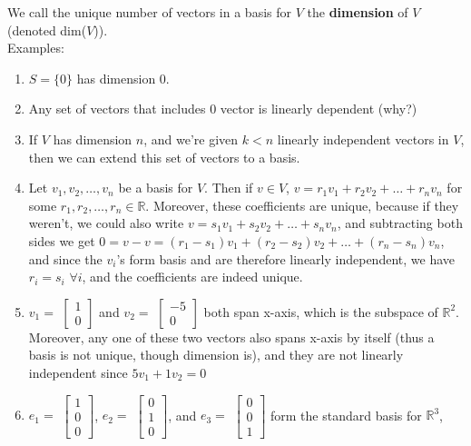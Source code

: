 \documentclass[12pt,oneside]{article}
\begin{document}
We call the unique number of vectors in a basis for $V$ the
\textbf{dimension} of $V$ (denoted dim($V$)).\\

\noindent Examples:
\begin{enumerate}
\item $S =\{0\}$ has dimension 0.
\item Any set of vectors that includes $0$ vector is linearly
  dependent (why?)
\item If $V$ has dimension $n$, and we're given $k < n$ linearly
  independent vectors in $V$, then we can extend this set of vectors
  to a basis.
\item Let $v_1, v_2, \ldots, v_n$ be a basis for $V$. Then if $v \in
  V$, $v = r_1 v_1 + r_2 v_2 + \ldots + r_n v_n$ for some $r_1, r_2,
  \ldots, r_n \in \mathbb{R}$. Moreover, these coefficients are
  unique, because if they weren't, we could also write $v = s_1 v_1 + s_2
  v_2 + \ldots + s_n v_n$, and subtracting both sides we get $0 = v-v
  = (r_1 - s_1) v_1 + (r_2 - s_2) v_2 + \ldots + (r_n - s_n) v_n$, and
  since the $v_i$'s form basis and are therefore linearly independent,
  we have $r_i = s_i$ $\forall i$, and the coefficients are indeed unique.
\item $v_{1} = $ $\left[ \begin{array} {c} 1 \\ 0 \end{array} \right]$ and
  $v_{2} =$ $\left[ \begin{array} {c} -5 \\ 0 \end{array} \right]$ both span
  x-axis, which is the subspace of ${\mathbb{R}}^{2}$. Moreover, any
  one of these two vectors also spans x-axis by itself (thus a
  basis is not unique, though dimension is), and they
  are not linearly independent since $5 v_{1} + 1 v_{2} = 0$
\item $e_{1} =$ $\left[ \begin{array} {c} 1 \\ 0 \\ 0 \end{array}
  \right]$, $e_{2} =$ $\left[ \begin{array} {c} 0 \\ 1 \\ 0
  \end{array} \right]$, and $e_{3} =$ $\left[ \begin{array} {c} 0 \\ 0
  \\ 1 \end{array} \right]$ form the standard basis for ${\mathbb{R}^3}$,

\end{enumerate}
\end{document}
